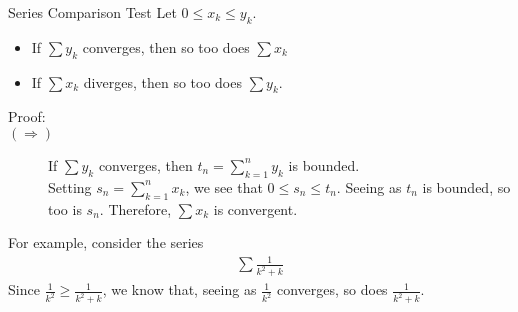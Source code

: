 \documentclass[10pt]{extarticle}
\begin{document}
  \begin{problem}{Series Comparison Test}
    Let $0 \leq x_k \leq y_k$.
    \begin{itemize}
      \item If $\sum y_k$ converges, then so too does $\sum x_k$
      \item If $\sum x_k$ diverges, then so too does $\sum y_k$.
    \end{itemize}
    \begin{description}
      \item[Proof:]\hfill
      \item[$(\Rightarrow)$] If $\sum y_k$ converges, then $t_n = \sum_{k=1}^{n}y_k$ is bounded.\\

        Setting $s_n = \sum_{k=1}^{n}x_k$, we see that $0 \leq s_n \leq t_n$. Seeing as $t_n$ is bounded, so too is $s_n$. Therefore, $\sum x_k$ is convergent.
    \end{description}
    For example, consider the series
    \begin{align*}
      \sum \frac{1}{k^2 + k}
    \end{align*}
    Since $\frac{1}{k^2} \geq \frac{1}{k^2 + k}$, we know that, seeing as $\frac{1}{k^2}$ converges, so does $\frac{1}{k^2 + k}$.
  \end{problem}
\end{document}
